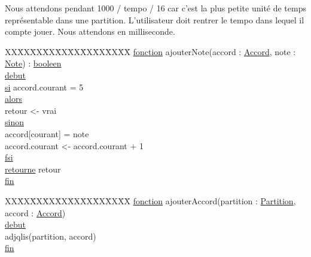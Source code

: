 Nous attendons pendant 1000 / tempo / 16 car c'est la plus petite unité de temps représentable dans une partition. L'utilisateur doit rentrer le tempo dans lequel il compte jouer.
Nous attendons en milliseconde.


\begin{tabbing}
\kill XX\=XX\=XX\=XX\=XX\=XX\=XX\=XX\=XX\=XX\=
\kill
\ul{fonction} ajouterNote(accord : \ul{Accord}, note : \ul{Note}) : \ul{booleen}\\ 
\ul{debut}\\
    \>\ul{si} accord.courant = 5\\
    \>\ul{alors}\\
        \>\>retour <- vrai\\
    \>\ul{sinon}\\
        \>\>accord[courant] = note\\
        \>\>accord.courant <- accord.courant + 1\\
    \>\ul{fsi}\\
    \>\ul{retourne} retour\\ 
\ul{fin}\\
\end{tabbing}

\begin{tabbing}
\kill XX\=XX\=XX\=XX\=XX\=XX\=XX\=XX\=XX\=XX\=
\kill
\ul{fonction} ajouterAccord(partition : \ul{Partition}, accord : \ul{Accord})\\
\ul{debut}\\
    \>adjqlis(partition, accord)\\
\ul{fin}\\
\end{tabbing}


